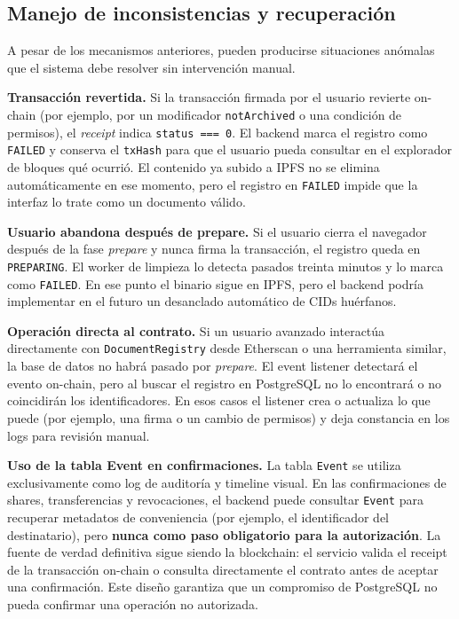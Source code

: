 \documentclass[11pt, a4paper]{article}
\begin{document}
\subsection{Manejo de inconsistencias y recuperación}

A pesar de los mecanismos anteriores, pueden producirse situaciones anómalas que el sistema debe resolver sin intervención manual.

\textbf{Transacción revertida.} Si la transacción firmada por el usuario revierte on-chain (por ejemplo, por un modificador \texttt{notArchived} o una condición de permisos), el \textit{receipt} indica \texttt{status === 0}. El backend marca el registro como \texttt{FAILED} y conserva el \texttt{txHash} para que el usuario pueda consultar en el explorador de bloques qué ocurrió. El contenido ya subido a IPFS no se elimina automáticamente en ese momento, pero el registro en \texttt{FAILED} impide que la interfaz lo trate como un documento válido.

\textbf{Usuario abandona después de prepare.} Si el usuario cierra el navegador después de la fase \textit{prepare} y nunca firma la transacción, el registro queda en \texttt{PREPARING}. El worker de limpieza lo detecta pasados treinta minutos y lo marca como \texttt{FAILED}. En ese punto el binario sigue en IPFS, pero el backend podría implementar en el futuro un desanclado automático de CIDs huérfanos.

\textbf{Operación directa al contrato.} Si un usuario avanzado interactúa directamente con \texttt{DocumentRegistry} desde Etherscan o una herramienta similar, la base de datos no habrá pasado por \textit{prepare}. El event listener detectará el evento on-chain, pero al buscar el registro en PostgreSQL no lo encontrará o no coincidirán los identificadores. En esos casos el listener crea o actualiza lo que puede (por ejemplo, una firma o un cambio de permisos) y deja constancia en los logs para revisión manual.

\textbf{Uso de la tabla Event en confirmaciones.} La tabla \texttt{Event} se utiliza exclusivamente como log de auditoría y timeline visual. En las confirmaciones de shares, transferencias y revocaciones, el backend puede consultar \texttt{Event} para recuperar metadatos de conveniencia (por ejemplo, el identificador del destinatario), pero \textbf{nunca como paso obligatorio para la autorización}. La fuente de verdad definitiva sigue siendo la blockchain: el servicio valida el receipt de la transacción on-chain o consulta directamente el contrato antes de aceptar una confirmación. Este diseño garantiza que un compromiso de PostgreSQL no pueda confirmar una operación no autorizada.
\end{document}
